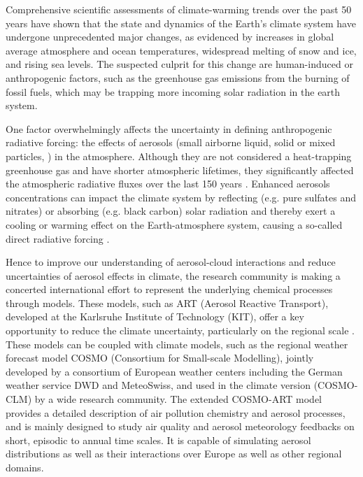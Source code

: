 Comprehensive  scientific assessments  of climate-warming  trends over
the  past 50  years have  shown  that the  state and  dynamics of  the
Earth's climate system have  undergone unprecedented major changes, as
evidenced  by  increases  in   global  average  atmosphere  and  ocean
temperatures,  widespread melting  of  snow and  ice,  and rising  sea
levels.  The  suspected culprit for  this change are  human-induced or
anthropogenic factors,  such as the greenhouse gas  emissions from the
burning of  fossil fuels,  which may be  trapping more  incoming solar
radiation in the earth system.

One  factor   overwhelmingly  affects  the   uncertainty  in  defining
anthropogenic  radiative  forcing:  the  effects  of  aerosols  (small
airborne liquid,  solid or mixed  particles, \citealp{Putaud-2010}) in
the  atmosphere.  Although  they  are not  considered a  heat-trapping
greenhouse   gas  and   have  shorter   atmospheric   lifetimes,  they
significantly affected the atmospheric  radiative fluxes over the last
150    years   \citep{Koch-2009,   IPCC-2013}.     Enhanced   aerosols
concentrations can impact the climate system by reflecting (e.g.  pure
sulfates  and  nitrates)  or  absorbing  (e.g.   black  carbon)  solar
radiation  and  thereby exert  a  cooling  or  warming effect  on  the
Earth-atmosphere   system,  causing   a  so-called   direct  radiative
forcing     \citep{Charlson-1991,    Haywood-2000,    Ramanathan-2001,
Liao-2005, Bangert-2012, Lundgren-2013}.

Hence to  improve our understanding of  aerosol-cloud interactions and
reduce  uncertainties  of aerosol  effects  in  climate, the  research
community is making a  concerted international effort to represent the
underlying chemical  processes through models.  These  models, such as
ART (Aerosol Reactive Transport), developed at the Karlsruhe Institute
of Technology  (KIT), offer  a key opportunity  to reduce  the climate
uncertainty,  particularly on  the  regional scale  \citep{Knote-2011,
Bangert-2011, Knote-2013}.   These models can be  coupled with climate
models, such as the  regional weather forecast model COSMO (Consortium
for  Small-scale  Modelling), jointly  developed  by  a consortium  of
European weather centers including  the German weather service DWD and
MeteoSwiss,  and used  in the  climate version  (COSMO-CLM) by  a wide
research community.  The extended  COSMO-ART model provides a detailed
description of  air pollution chemistry and aerosol  processes, and is
mainly designed to study air quality and aerosol meteorology feedbacks
on short, episodic to annual time scales.  It is capable of simulating
aerosol  distributions as well  as their  interactions over  Europe as
well as other regional domains.

